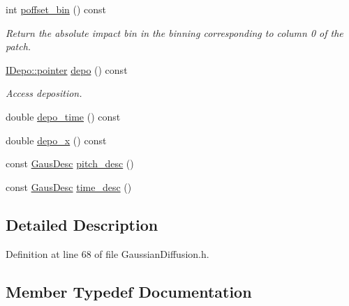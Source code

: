 \begin{DoxyCompactItemize}
int \hyperlink{class_wire_cell_1_1_gen_1_1_gaussian_diffusion_ae818d9a49c5d073cad70869dfed232f2}{poffset\+\_\+bin} () const
\begin{DoxyCompactList}\small\item\em Return the absolute impact bin in the binning corresponding to column 0 of the patch. \end{DoxyCompactList}\item 
\hyperlink{class_wire_cell_1_1_i_data_aff870b3ae8333cf9265941eef62498bc}{I\+Depo\+::pointer} \hyperlink{class_wire_cell_1_1_gen_1_1_gaussian_diffusion_af47821d09cdf3b3db6e7ffe8e9a70fb9}{depo} () const
\begin{DoxyCompactList}\small\item\em Access deposition. \end{DoxyCompactList}\item 
double \hyperlink{class_wire_cell_1_1_gen_1_1_gaussian_diffusion_a341ca8513406748c83172aac63202b45}{depo\+\_\+time} () const
\item 
double \hyperlink{class_wire_cell_1_1_gen_1_1_gaussian_diffusion_a4c5715de0b0b2c0daac3b132ed0fba07}{depo\+\_\+x} () const
\item 
const \hyperlink{struct_wire_cell_1_1_gen_1_1_gaus_desc}{Gaus\+Desc} \hyperlink{class_wire_cell_1_1_gen_1_1_gaussian_diffusion_a356c64883ec23fcf9c5b2ef056cf4888}{pitch\+\_\+desc} ()
\item 
const \hyperlink{struct_wire_cell_1_1_gen_1_1_gaus_desc}{Gaus\+Desc} \hyperlink{class_wire_cell_1_1_gen_1_1_gaussian_diffusion_a7c3c7dbfeb34c5cb778c873343772427}{time\+\_\+desc} ()
\end{DoxyCompactItemize}


\subsection{Detailed Description}


Definition at line 68 of file Gaussian\+Diffusion.\+h.



\subsection{Member Typedef Documentation}
\mbox{\label{class_wire_cell_1_1_gen_1_1_gaussian_diffusion_a33cd8c39349ac40f3757405be6d8f7b0}} 
